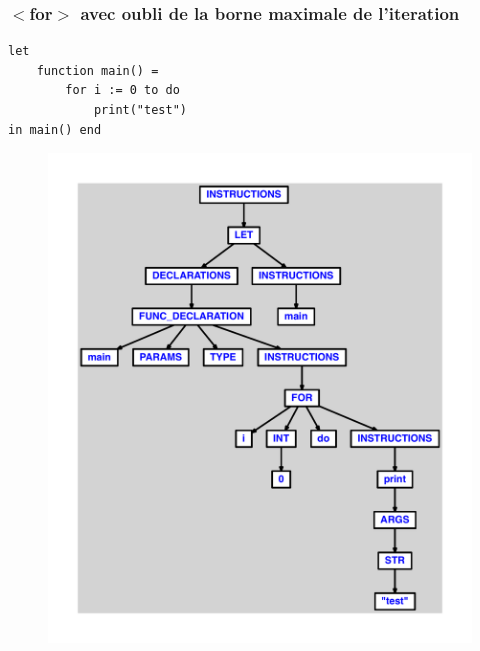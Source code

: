 \documentclass{article}
\begin{document}
\subsubsection{$ < $for$ > $ avec oubli de la borne maximale de l'iteration}
\begin{lstlisting}
let
	function main() =
		for i := 0 to do
			print("test")
in main() end
\end{lstlisting}
\newpage
\begin{figure}[H]
\centering
\includegraphics[max width=\textwidth]{ast/ast_199.pdf}
\end{figure}
\newpage
\end{document}
